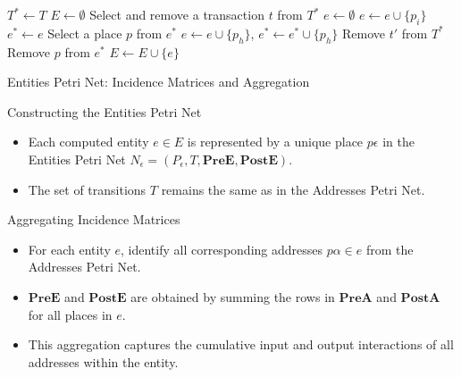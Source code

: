 \documentclass{beamer}
\begin{document}
\begin{frame}[fragile]{}
    \footnotesize
    \begin{algorithm}[H]
        \footnotesize
        \caption{Compute Entities from the Addresses Petri Net}\label{alg:entities}
        \begin{algorithmic}[1]
            \State $T^* \gets T$ 
            \State $E \gets \emptyset$ 
            \State Select and remove a transaction $t$ from $T^*$
            \State $e \gets \emptyset$ 
            \State $e \gets e \cup \{p_i\}$
            \EndFor
            \State $e^* \gets e$ 
            \State Select a place $p$ from $e^*$
            \State $e \gets e \cup \{p_h\}$, $e^* \gets e^* \cup \{p_h\}$
            \EndFor
            \State Remove $t'$ from $T^*$
            \EndFor
            \State Remove $p$ from $e^*$
            \EndWhile
            \State $E \gets E \cup \{e\}$
            \EndWhile
        \end{algorithmic}
    \end{algorithm}
\end{frame}

\begin{frame}{Entities Petri Net: Incidence Matrices and Aggregation}
    \footnotesize
    \begin{block}{Constructing the Entities Petri Net}
        \begin{itemize}
            \item Each computed entity \(e \in E\) is represented by a unique place \(p\epsilon\) in the Entities Petri Net \(N_{\epsilon}=(P_{\epsilon}, T, \mathbf{PreE}, \mathbf{PostE})\).
            \item The set of transitions \(T\) remains the same as in the Addresses Petri Net.
        \end{itemize}
    \end{block}

    \begin{block}{Aggregating Incidence Matrices}
        \begin{itemize}
            \item For each entity \(e\), identify all corresponding addresses \(p\alpha \in e\) from the Addresses Petri Net.
            \item \(\mathbf{PreE}\) and \(\mathbf{PostE}\) are obtained by summing the rows in \(\mathbf{PreA}\) and \(\mathbf{PostA}\) for all places in \(e\).
            \item This aggregation captures the cumulative input and output interactions of all addresses within the entity.
        \end{itemize}
    \end{block}
\end{frame}
\end{document}
